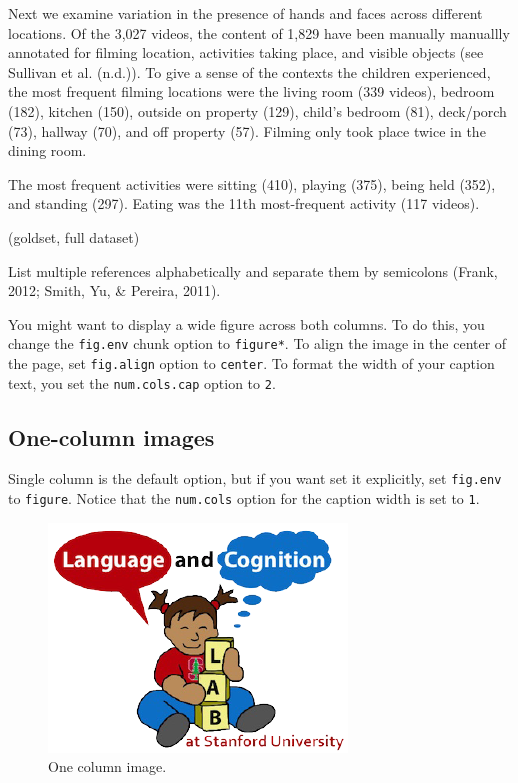 \documentclass[10pt, letterpaper]{article}
\newenvironment{CodeChunk}{}{}
\begin{document}
Next we examine variation in the presence of hands and faces across
different locations. Of the 3,027 videos, the content of 1,829 have been
manually manuallly annotated for filming location, activities taking
place, and visible objects (see Sullivan et al. (n.d.)). To give a sense
of the contexts the children experienced, the most frequent filming
locations were the living room (339 videos), bedroom (182), kitchen
(150), outside on property (129), child's bedroom (81), deck/porch (73),
hallway (70), and off property (57). Filming only took place twice in
the dining room.

The most frequent activities were sitting (410), playing (375), being
held (352), and standing (297). Eating was the 11th most-frequent
activity (117 videos).

(goldset, full dataset)

List multiple references alphabetically and separate them by semicolons
(Frank, 2012; Smith, Yu, \& Pereira, 2011).

You might want to display a wide figure across both columns. To do this,
you change the \texttt{fig.env} chunk option to \texttt{figure*}. To
align the image in the center of the page, set \texttt{fig.align} option
to \texttt{center}. To format the width of your caption text, you set
the \texttt{num.cols.cap} option to \texttt{2}.

\hypertarget{one-column-images}{%
\subsection{One-column images}\label{one-column-images}}

Single column is the default option, but if you want set it explicitly,
set \texttt{fig.env} to \texttt{figure}. Notice that the
\texttt{num.cols} option for the caption width is set to \texttt{1}.

\begin{CodeChunk}
\begin{figure}[H]

{\centering \includegraphics{figs/image-1} 

}

\caption[One column image]{One column image.}\label{fig:image}
\end{figure}
\end{CodeChunk}
\end{document}
